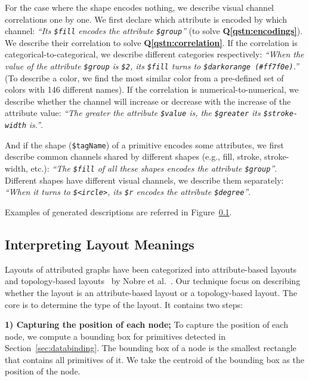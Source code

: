 For the case where the shape encodes nothing, we describe visual channel correlations one by one.
We first declare which attribute is encoded by which channel: \textit{``Its \texttt{\$fill} encodes the attribute \texttt{\$group}''} (to solve \textbf{Q\ref{qstn:encodings}}).
We describe their correlation to solve \textbf{Q\ref{qstn:correlation}}.
If the correlation is categorical-to-categorical, we describe different categories respectively: \textit{``When the value of the attribute \texttt{\$group} is \texttt{\$2}, its \texttt{\$fill} turns to \texttt{\$darkorange (\#ff7f0e)}.''} (To describe a color, we find the most similar color from a pre-defined set of colors with 146 different names).
If the correlation is numerical-to-numerical, we describe whether the channel will increase or decrease with the increase of the attribute value: \textit{``The greater the attribute \texttt{\$value} is, the \texttt{\$greater} its \texttt{\$stroke-width} is.''}.

And if the shape (\texttt{\$tagName}) of a primitive encodes some attributes, we first describe common channels shared by different shapes (e.g., fill, stroke, stroke-width, etc.): \textit{``The \texttt{\$fill} of all these shapes encodes the attribute \texttt{\$group}''}.
Different shapes have different visual channels, we describe them separately: \textit{``When it turns to \texttt{\$<ircle>}, its \texttt{\$r} encodes the attribute \texttt{\$degree}''}.

Examples of generated descriptions are referred in Figure~\ref{}.

\subsection{Interpreting Layout Meanings}
Layouts of attributed graphs have been categorized into attribute-based layouts~\cite{} and topology-based layouts~\cite{} by Nobre et al.~\cite{DBLP:journals/cgf/NobreMSL19}.
Our technique focus on describing whether the layout is an attribute-based layout or a topology-based layout.
The core is to determine the type of the layout.
It contains two steps: 

\textbf{1) Capturing the position of each node;} To capture the position of each node, we compute a bounding box for primitives detected in Section~\ref{sec:databinding}.
The bounding box of a node is the smallest rectangle that contains all primitives of it.
We take the centroid of the bounding box as the position of the node.

